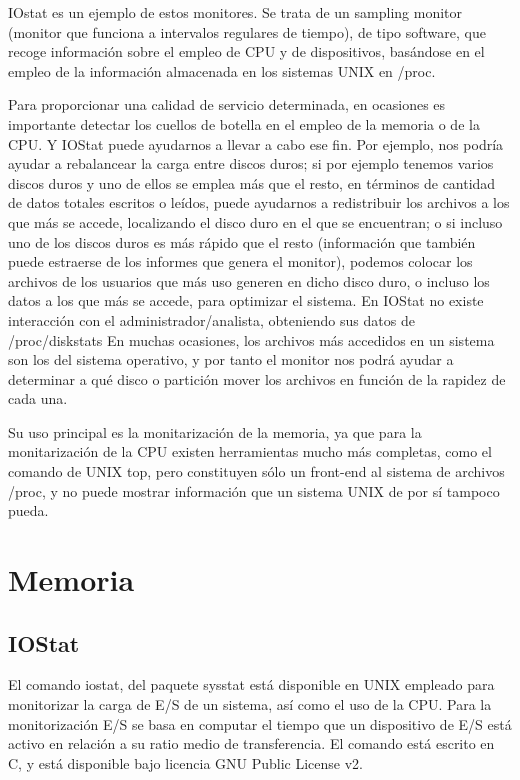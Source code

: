 \documentclass[a4paper,10pt]{article}
\renewcommand{\texttt}[2][black!60]{\textcolor{#1}{\ttfamily #2}}
\begin{document}
IOstat es un ejemplo de estos monitores. Se trata de un sampling monitor (monitor que funciona a intervalos regulares de
tiempo), de tipo software, que recoge información sobre el empleo de CPU y de dispositivos, basándose en el empleo de la información almacenada
en los sistemas UNIX en \texttt{/proc}.

Para proporcionar una calidad de servicio determinada, en ocasiones es importante detectar los cuellos de botella en el empleo
de la memoria o de la CPU. Y \texttt{IOStat} puede ayudarnos a llevar a cabo ese fin. Por ejemplo, nos podría ayudar a rebalancear
la carga entre discos duros; si por ejemplo tenemos varios discos duros y uno de ellos se emplea más que el resto, en términos
de cantidad de datos totales escritos o leídos, puede ayudarnos a redistribuir los archivos a los que más se accede, localizando
el disco duro en el que se encuentran; o si incluso uno de los discos duros es más rápido que el resto (información que 
también puede estraerse de los informes que genera el monitor), podemos colocar los archivos de los usuarios que más uso generen en dicho
disco duro, o incluso los datos a los que más se accede, para optimizar el sistema. En IOStat no existe interacción con el 
administrador/analista, obteniendo sus datos de \texttt{/proc/diskstats}
En muchas ocasiones, los archivos más accedidos en un sistema son los del sistema operativo, y por tanto el monitor nos podrá
ayudar a determinar a qué disco o partición mover los archivos en función de la rapidez de cada una. \cite{merelo}

Su uso principal es la monitarización de la memoria, ya que para la monitarización de la CPU existen herramientas mucho más
completas, como el comando de UNIX \texttt{top}, pero constituyen sólo  un front-end al sistema de archivos \texttt{/proc}, y no
puede mostrar información que un sistema UNIX de por sí tampoco pueda. \cite{readme}

\section{Memoria}
\subsection{IOStat \cite{maniostat}}
El comando \texttt{iostat}, del paquete \texttt{sysstat} está disponible en UNIX empleado para monitorizar la carga de E/S de un sistema,
así como el uso de la CPU. Para la monitorización E/S se basa en computar el tiempo que un dispositivo de E/S está activo en 
relación a su ratio medio de transferencia. El comando está escrito en C, y está disponible bajo licencia GNU Public License v2.
\end{document}
